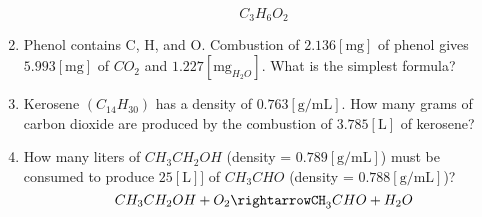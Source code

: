 \documentclass[12pt]{article}
\begin{document}
\begin{enumerate}
    $$C_3H_6O_2$$

  \item Phenol contains C, H, and O. Combustion of $2.136[\si{\milli\gram}]$ of phenol gives $5.993[\si{\milli\gram}]$ of $CO_2$ and $1.227[\si{\milli\gram}_{H_2O}]$. What is the simplest formula?

  \item Kerosene $(C_{14}H_{30})$ has a density of $0.763[\si{\gram\per\milli\liter}]$. How many grams of carbon dioxide are produced by the combustion of $3.785[\si{\liter}]$ of kerosene? 

  \item  How many liters of $CH_3CH_2OH$ (density = $0.789[\si{\gram\per\milli\liter}]$) must be consumed to produce $25[\si{\liter}]]$ of $CH_3CHO$ (density = $0.788[\si{\gram\per\milli\liter}]$)?
  $$CH_3CH_2OH+O_2\rightarrowCH_3CHO+H_2O$$

\end{enumerate}
\end{document}
